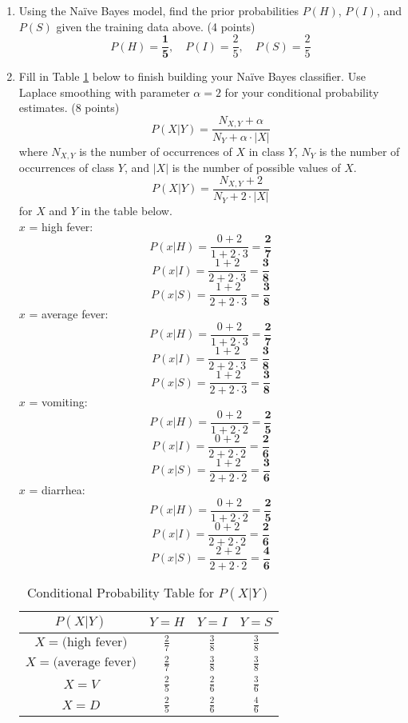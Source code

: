 \documentclass[a3paper,12pt]{article} %
\begin{document}
\begin{enumerate}
    \item Using the Na\"ive Bayes model, find the prior probabilities \( P(H) \), \( P(I) \), and \( P(S) \) given the training data above. (4 points)
    \[
    P(H) = \mathbf{\frac{1}{5}}, \quad P(I) = \frac{2}{5}, \quad P(S) = \frac{2}{5}
    \]
    \item Fill in Table \ref{tab:conditional_probs} below to finish building your Na\"ive Bayes classifier. Use Laplace smoothing with parameter \( \alpha = 2 \) for your conditional probability estimates. (8 points)
    \[
    P(X|Y) = \frac{N_{X,Y} + \alpha}{N_Y + \alpha \cdot |X|}
    \]
    where \( N_{X,Y} \) is the number of occurrences of \( X \) in class \( Y \), \( N_Y \) is the number of occurrences of class \( Y \), and \( |X| \) is the number of possible values of \( X \).
    \[
    P(X|Y) = \frac{N_{X,Y} + 2}{N_Y + 2 \cdot |X|}
    \]
    for \( X \) and \( Y \) in the table below.
    \\ \(x\) = high fever:
    \[
    P(x|H) = \frac{0 + 2}{1 + 2 \cdot 3} = \mathbf{\frac{2}{7}}
    \] 
    \[
    P(x|I) = \frac{1 + 2}{2 + 2 \cdot 3} = \mathbf{\frac{3}{8}}
    \]
    \[
    P(x|S) = \frac{1 + 2}{2 + 2 \cdot 3} = \mathbf{\frac{3}{8}}
    \]
    \(x\) = average fever:
    \[
    P(x|H) = \frac{0 + 2}{1 + 2 \cdot 3} = \mathbf{\frac{2}{7}}
    \]
    \[
    P(x|I) = \frac{1 + 2}{2 + 2 \cdot 3} = \mathbf{\frac{3}{8}}
    \]
    \[
    P(x|S) = \frac{1 + 2}{2 + 2 \cdot 3} = \mathbf{\frac{3}{8}}
    \]
    \(x\) = vomiting:
    \[
    P(x|H) = \frac{0 + 2}{1 + 2 \cdot 2} = \mathbf{\frac{2}{5}}
    \]
    \[
    P(x|I) = \frac{0 + 2}{2 + 2 \cdot 2} = \mathbf{\frac{2}{6}}
    \]
    \[
    P(x|S) = \frac{1 + 2}{2 + 2 \cdot 2} = \mathbf{ \frac{3}{6}}
    \]
    \(x\) = diarrhea:
    \[
    P(x|H) = \frac{0 + 2}{1 + 2 \cdot 2} = \mathbf{\frac{2}{5}}
    \]
    \[
    P(x|I) = \frac{0 + 2}{2 + 2 \cdot 2} = \mathbf{\frac{2}{6}}
    \]
    \[
    P(x|S) = \frac{2 + 2}{2 + 2 \cdot 2} = \mathbf{\frac{4}{6}}
    \]
    
    \begin{table}[h]
    \centering
    \begin{tabular}{|c|c|c|c|}
    \hline
    \( P(X|Y) \) & \( Y = H \) & \( Y = I \) & \( Y = S \) \\
    \hline
    \( X = \text{(high fever)} \) & \(\frac{2}{7}\) & \(\frac{3}{8}\)  & \(\frac{3}{8}\) \\
    \( X = \text{(average fever)} \) & \(\frac{2}{7}\) & \(\frac{3}{8}\)  & \(\frac{3}{8}\) \\
    \( X = V \) &  \(\frac{2}{5}\) & \(\frac{2}{6}\) & \(\frac{3}{6}\) \\
    \( X = D \) & \(\frac{2}{5}\)  & \(\frac{2}{6}\) & \(\frac{4}{6}\) \\
    \hline
    \end{tabular}
    \caption{Conditional Probability Table for \( P(X|Y) \)}
    \label{tab:conditional_probs}
    \end{table}


\end{enumerate}
\end{document}
